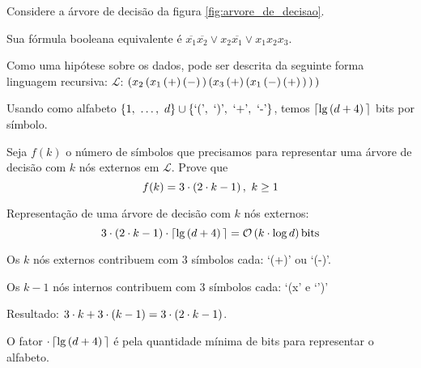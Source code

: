 \begin{exemplo}
  Considere a árvore de decisão da figura \autoref{fig:arvore_de_decisao}.

  Sua fórmula booleana equivalente é $\overline{x_1}\overline{x_2}\lor x_2\overline{x_1}\lor x_1x_2x_3$.

  Como uma hipótese sobre os dados, pode ser descrita da seguinte forma linguagem recursiva:
  {
    \delimitershortfall=-1pt
    $\mathcal{L}$: 
    $\left(x_2
            \left(x_1
                  \left(+\vphantom{1j}\right)
                  \left(-\vphantom{1j}\right)
            \vphantom{1j}\right)
            \left(x_3
                  \left(+\vphantom{1j}\right)
                  \left(x_1
                      \left(-\vphantom{1j}\right)
                      \left(+\vphantom{1j}\right)
                  \vphantom{1j}\right)
            \vphantom{1j}\right)
      \vphantom{1j}\right)$
  }

  Usando como alfabeto $\left\{1,\ \ldots,\ d\vphantom{1j}\right\}\cup\left\{\text{`('},\ \text{`)'},\ \text{`+'},\ \text{`-'}\vphantom{1j}\right\}$, temos $\left\lceil\lg\left(d+4\vphantom{1j}\right)\vphantom{1j}\right\rceil$ bits por símbolo.
\end{exemplo}

\begin{exercicio}
  Seja $f(k)$ o número de símbolos que precisamos para representar uma árvore de decisão com $k$ nós externos em $\mathcal{L}$. Prove que
  \[
    f(k) = 3\cdot\left(2\cdot k-1\vphantom{1j}\right),\ k\geq 1
  \]

  Representação de uma árvore de decisão com $k$ nós externos:
  \[
    3\cdot\left(2\cdot k-1\vphantom{1j}\right)\cdot\left\lceil\lg\left(d+4\vphantom{1j}\right)\vphantom{1j}\right\rceil = \mathcal{O}\left(k\cdot\log d\vphantom{1j}\right) \text{bits}
  \]
\end{exercicio}
\begin{resolucao}
  Os $k$ nós externos contribuem com $3$ símbolos cada: `(+)' ou `(-)'.

  Os $k-1$ nós internos contribuem com $3$ símbolos cada: `(x' e `')'

  Resultado: $3\cdot k + 3\cdot\left(k-1\vphantom{1j}\right) = 3\cdot\left(2\cdot k-1\vphantom{1j}\right)$.

  O fator $\cdot\left\lceil\lg\left(d+4\vphantom{1j}\right)\vphantom{1j}\right\rceil$ é pela quantidade mínima de bits para representar o alfabeto.
\end{resolucao}

